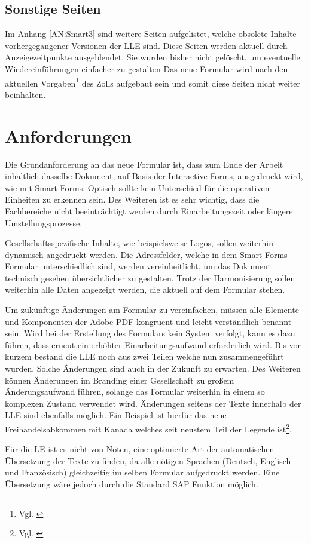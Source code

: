 	
	\subsection{Sonstige Seiten}
	
	Im Anhang \ref{AN:Smart3} sind weitere Seiten aufgelistet, welche obsolete Inhalte vorhergegangener Versionen der \ac{LLE} sind. Diese Seiten werden aktuell durch Anzeigezeitpunkte ausgeblendet. Sie wurden bisher nicht gelöscht, um eventuelle Wiedereinführungen einfacher zu gestalten
	Das neue Formular wird nach den aktuellen Vorgaben\footnote{Vgl. \cite{ZOLL.2017}} des Zolls aufgebaut sein und somit diese Seiten nicht weiter beinhalten.
	
	
	\FloatBarrier
	\section{Anforderungen}
	\label{ch:Anf}
		Die Grundanforderung an das neue Formular ist, dass zum Ende der Arbeit inhaltlich dasselbe Dokument, auf Basis der Interactive Forms, ausgedruckt wird, wie mit Smart Forms. Optisch sollte kein Unterschied für die operativen Einheiten zu erkennen sein. Des Weiteren ist es sehr wichtig, dass die Fachbereiche nicht beeinträchtigt werden durch Einarbeitungszeit oder längere Umstellungsprozesse. 
	
		Gesellschaftsspezifische Inhalte, wie beispielsweise Logos, sollen weiterhin dynamisch angedruckt werden.
		Die Adressfelder, welche in dem Smart Forms-Formular unterschiedlich sind, werden vereinheitlicht, um das Dokument technisch gesehen übersichtlicher zu gestalten. Trotz der Harmonisierung sollen weiterhin alle Daten angezeigt werden, die aktuell auf dem Formular stehen. 
		
		Um zukünftige Änderungen am Formular zu vereinfachen, müssen alle Elemente und Komponenten der Adobe \ac{PDF} kongruent und leicht verständlich benannt sein. Wird bei der Erstellung des Formulars kein System verfolgt, kann es dazu führen, dass erneut ein erhöhter Einarbeitungsaufwand erforderlich wird. Bis vor kurzem bestand die \ac{LLE} noch aus zwei Teilen welche nun zusammengeführt wurden. Solche Änderungen sind auch in der Zukunft zu erwarten. Des Weiteren können Änderungen im Branding einer Gesellschaft zu großem Änderungsaufwand führen, solange das Formular weiterhin in einem so komplexen Zustand verwendet wird. Änderungen seitens der Texte innerhalb der \ac{LLE} sind ebenfalls möglich. Ein Beispiel ist hierfür das neue Freihandelsabkommen mit Kanada welches seit neustem Teil der Legende ist\footnote{Vgl. \cite{ZOLL.2017b}}.
		
		Für die \ac{LE} ist es nicht von Nöten, eine optimierte Art der automatischen Übersetzung der Texte zu finden, da alle nötigen Sprachen (Deutsch, Englisch und Französisch) gleichzeitig im selben Formular aufgedruckt werden. Eine Übersetzung wäre jedoch durch die Standard SAP Funktion möglich.
		
